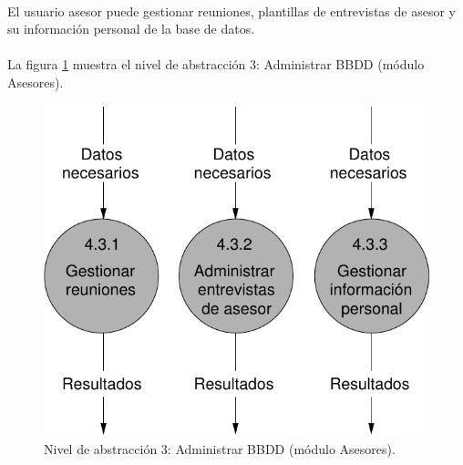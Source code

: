 \paragraph{}El usuario asesor puede gestionar reuniones, plantillas de
entrevistas de asesor y su información personal de la base de datos.

\paragraph{}La figura \ref{diagramaNivel3-AdministrarBBDD-asesor} muestra
el nivel de abstracción 3: Administrar BBDD (módulo Asesores).

  \begin{figure}[!ht]
    \begin{center}
      \includegraphics[]{08.Analisis_Funcional/8.2.DFDs/Niveles/Nivel3/Asesores/AdministrarBBDD/Diagramas/nivel3-AdministrarBBDD.pdf}
      \caption{Nivel de abstracción 3: Administrar BBDD (módulo Asesores).}
      \label{diagramaNivel3-AdministrarBBDD-asesor}
    \end{center}
  \end{figure}